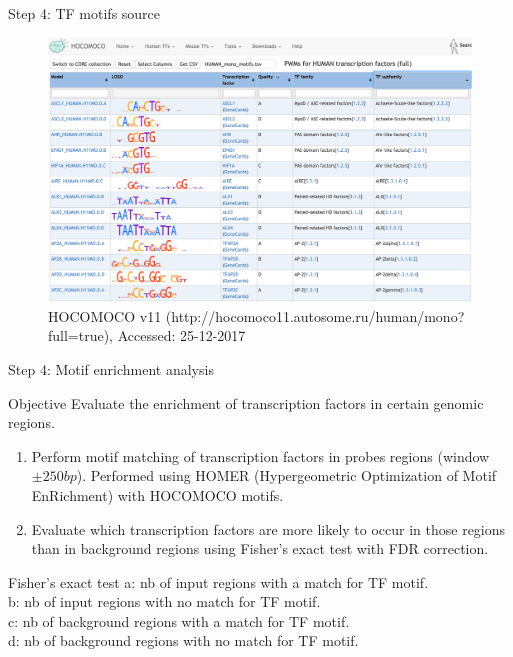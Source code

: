 \documentclass[slidestop,compress,11pt,xcolor=dvipsnames]{beamer}
\begin{document}
\begin{frame}{Step 4:  TF motifs source}
 \vspace*{-0.3cm}
 \begin{figure}
  \centering
  \includegraphics[width=1.0\linewidth]{ELMER/hocomoco.png}{\tiny{\\HOCOMOCO v11 (http://hocomoco11.autosome.ru/human/mono?full=true), Accessed: 25-12-2017}}
 \end{figure}
\end{frame}

\begin{frame}{Step 4: Motif enrichment analysis}

\begin{block}{Objective}
Evaluate the enrichment of transcription factors in certain genomic regions.
\begin{enumerate}
  \item Perform motif matching of transcription factors in probes regions (window $\pm250bp$). Performed using HOMER (Hypergeometric Optimization of Motif EnRichment) with HOCOMOCO motifs.
  \item Evaluate which transcription factors are more likely to occur in those regions than in background regions
  using Fisher’s exact test with FDR correction.
\end{enumerate}
\end{block}
 \begin{exampleblock}{Fisher’s exact test}
 a: nb of input regions with a match for TF motif.\\
 b: nb of input regions with no match for TF motif.\\
 c: nb of background regions with a match for TF motif.\\
 d: nb of background regions with no match for TF motif.
 \end{exampleblock}

\end{frame}
\end{document}
